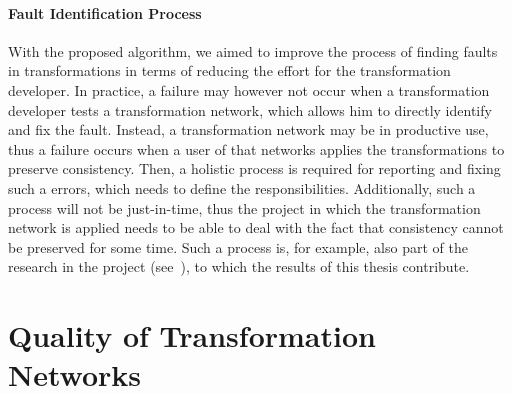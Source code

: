 \paragraph{Fault Identification Process}
\label{chap:futurework:correctness:orchestration:process}
With the proposed algorithm, we aimed to improve the process of finding faults in transformations in terms of reducing the effort for the transformation developer.
In practice, a failure may however not occur when a transformation developer tests a transformation network, which allows him to directly identify and fix the fault.
Instead, a transformation network may be in productive use, thus a failure occurs when a user of that networks applies the transformations to preserve consistency.
Then, a holistic process is required for reporting and fixing such a errors, which needs to define the responsibilities.
Additionally, such a process will not be just-in-time, thus the project in which the transformation network is applied needs to be able to deal with the fact that consistency cannot be preserved for some time.
Such a process is, for example, also part of the research in the \vitruv project (see~\cite{klare2020Vitruv-JSS}), to which the results of this thesis contribute.



\section{Quality of Transformation Networks}